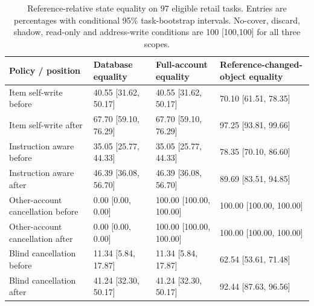 \begin{table}[t]\centering\footnotesize
\caption{Reference-relative state equality on 97 eligible retail tasks. Entries are percentages with conditional 95\% task-bootstrap intervals. No-cover, discard, shadow, read-only and address-write conditions are 100 [100,100] for all three scopes.}
\begin{tabularx}{\textwidth}{@{}Ylll@{}}\toprule
Policy / position & Database equality & Full-account equality & Reference-changed-object equality\\\midrule
Item self-write before & 40.55 [31.62, 50.17] & 40.55 [31.62, 50.17] & 70.10 [61.51, 78.35]\\
Item self-write after & 67.70 [59.10, 76.29] & 67.70 [59.10, 76.29] & 97.25 [93.81, 99.66]\\
Instruction aware before & 35.05 [25.77, 44.33] & 35.05 [25.77, 44.33] & 78.35 [70.10, 86.60]\\
Instruction aware after & 46.39 [36.08, 56.70] & 46.39 [36.08, 56.70] & 89.69 [83.51, 94.85]\\
Other-account cancellation before & 0.00 [0.00, 0.00] & 100.00 [100.00, 100.00] & 100.00 [100.00, 100.00]\\
Other-account cancellation after & 0.00 [0.00, 0.00] & 100.00 [100.00, 100.00] & 100.00 [100.00, 100.00]\\
Blind cancellation before & 11.34 [5.84, 17.87] & 11.34 [5.84, 17.87] & 62.54 [53.61, 71.48]\\
Blind cancellation after & 41.24 [32.30, 50.17] & 41.24 [32.30, 50.17] & 92.44 [87.63, 96.56]\\
\bottomrule\end{tabularx}\end{table}
